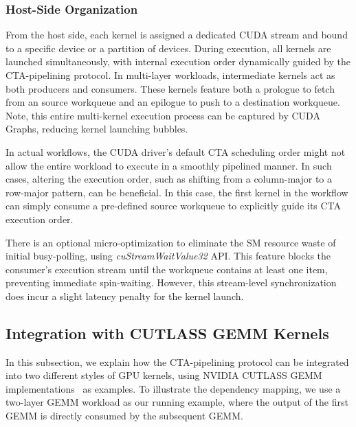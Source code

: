 


\subsubsection{Host-Side Organization}

From the host side, each kernel is assigned a dedicated CUDA stream and bound to a specific device or a partition of devices. During execution, all kernels are launched simultaneously, with internal execution order dynamically guided by the CTA-pipelining protocol. In multi-layer workloads, intermediate kernels act as both producers and consumers. These kernels feature both a prologue to fetch from an source workqueue and an epilogue to push to a destination workqueue. Note, this entire multi-kernel execution process can be captured by CUDA Graphs, reducing kernel launching bubbles. 

In actual workflows, the CUDA driver's default CTA scheduling order might not allow the entire workload to execute in a smoothly pipelined manner. In such cases, altering the execution order, such as shifting from a column-major to a row-major pattern, can be beneficial. In this case, the first kernel in the workflow can simply consume a pre-defined source workqueue to explicitly guide its CTA execution order.

There is an optional micro-optimization to eliminate the SM resource waste of initial busy-polling, using \textit{cuStreamWaitValue32} API. This feature blocks the consumer's execution stream until the workqueue contains at least one item, preventing immediate spin-waiting. However, this stream-level synchronization does incur a slight latency penalty for the kernel launch.


\subsection{Integration with CUTLASS GEMM Kernels}

In this subsection, we explain how the CTA-pipelining protocol can be integrated into two different styles of GPU kernels, using NVIDIA CUTLASS GEMM implementations~\cite{cutlass} as examples. To illustrate the dependency mapping, we use a two-layer GEMM workload as our running example, where the output of the first GEMM is directly consumed by the subsequent GEMM. 

